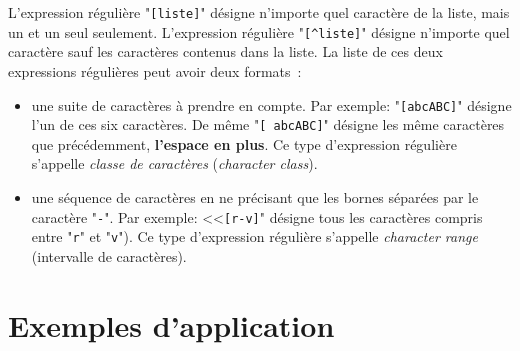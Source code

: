 L'expression r{\'e}guli{\`e}re "\verb=[liste]=" d{\'e}signe n'importe quel
caract{\`e}re de la liste, mais un et un seul seulement. L'expression
r{\'e}guli{\`e}re "\verb=[^liste]=" d{\'e}signe n'importe quel caract{\`e}re sauf les
caract{\`e}res contenus dans la liste. La liste de ces deux expressions
r{\'e}guli{\`e}res peut avoir deux formats~:
\begin{itemize}
	\item	une suite de caract{\`e}res {\`a} prendre en compte. Par exemple:
			"\verb=[abcABC]=" d{\'e}signe l'un de ces six caract{\`e}res. De m{\^e}me
			"\verb*=[ abcABC]=" d{\'e}signe les m{\^e}me caract{\`e}res que pr{\'e}c{\'e}demment,
			\textbf{l'espace en plus}. Ce type d'expression r{\'e}guli{\`e}re s'appelle 
			 \textsl{classe de caract{\`e}res} (\textsl{character class}).
	\item	une s{\'e}quence de caract{\`e}res en ne pr{\'e}cisant que les bornes s{\'e}par{\'e}es par
			le caract{\`e}re "\texttt{-}". Par exemple: <<\verb=[r-v]=" d{\'e}signe
			tous les caract{\`e}res compris entre "\texttt{r}" et "\texttt{v}").
			Ce type d'expression r{\'e}guli{\`e}re s'appelle \textsl{character range}
			(intervalle de caract{\`e}res).
\end{itemize}

\section{Exemples d'application}

